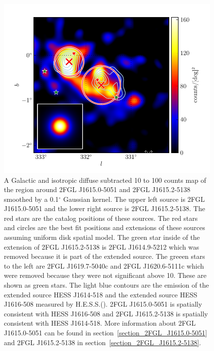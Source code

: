 \documentclass[12pt,preprint]{aastex}
\newcommand{\gev}{\text{GeV}\xspace}
\newcommand{\tev}{\text{TeV}\xspace}
\renewcommand{\deg}{\ensuremath{^\circ}\xspace}
\begin{document}
\begin{figure}
  \begin{center}
    \includegraphics[type=pdf,ext=.pdf,read=.pdf]{source_plots/source_1FGL_J1613.6-5100c}
  \end{center}
  \caption{
    A Galactic and isotropic diffuse subtracted 10 \gev to 100 \gev counts
    map of the region around 2FGL J1615.0-5051 and 2FGL J1615.2-5138
    smoothed by a 0.1\deg Gaussian kernel. The upper left source is
    2FGL J1615.0-5051 and the lower right source is 2FGL J1615.2-5138.
    The red stars are the catalog positions of these sources.  The red
    stars and circles are the best fit positions and extensions
    of these sources assuming uniform disk spatial model.  The green star
    inside of the extension of 2FGL J1615.2-5138  is 2FGL J1614.9-5212
    which was removed because it is part of the extended source.
    The greeen stars to the left are 2FGL J1619.7-5040c and 2FGL
    J1620.6-5111c which were removed because they were not significant
    above 10\gev. These are shown as green stars.  The light blue contours
    are the \tev emission of
    the extended source HESS J1614-518 and the extended source HESS
    J1616-508 measured by H.E.S.S.(\cite{hess_plane_survey}). 2FGL
    J1615.0-5051 is spatially
    consistent with HESS J1616-508 and 2FGL J1615.2-5138 is spatially
    consistent with HESS J1614-518.  More information about 2FGL
    J1615.0-5051 can be found in section~\ref{section_2FGL_J1615.0-5051} and
    2FGL J1615.2-5138 in section~\ref{section_2FGL_J1615.2-5138}.
  }\label{1FGL_J1613.6-5100c}
\end{figure}
\end{document}
